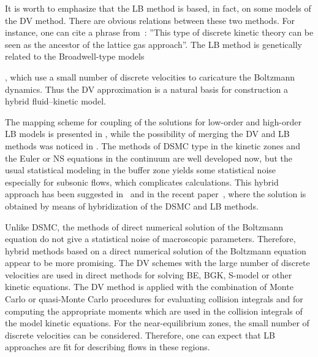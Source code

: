 \documentclass[]{elsarticle} %
\begin{document}
It is worth to emphasize that the LB method is based, in fact, on some models of the DV method.
There are obvious relations between these two methods. For instance, one can cite a phrase from~\cite{Rivet2001}:
''This type of discrete kinetic theory can be seen as the ancestor of the lattice gas approach''.
The LB method is genetically related to the Broadwell-type models~{\cite{Broadwell1964shock, Gatignol1975},
which use a small number of discrete velocities to caricature the Boltzmann dynamics.
Thus the DV approximation is a natural basis for construction a hybrid fluid--kinetic model.

The mapping scheme for coupling of the solutions for low-order and high-order LB models is presented in \cite{Meng2011},
while the possibility of merging the DV and LB methods was noticed in \cite{Succi2016}.
The methods of DSMC type in the kinetic zones and the Euler or NS equations in the continuum are well developed now,
but the usual statistical modeling in the buffer zone yields some statistical noise especially for subsonic flows, which complicates calculations.
This hybrid approach has been suggested in~\cite{Staso2016short, Staso2016long} and in the recent paper~\cite{Staso2018},
where the solution is obtained by means of hybridization of the DSMC and LB methods.

Unlike DSMC, the methods of direct numerical solution of the Boltzmann equation do not give a statistical noise of macroscopic parameters.
Therefore, hybrid methods based on a direct numerical solution of the Boltzmann equation appear to be more promising.
The DV schemes with the large number of discrete velocities are used in direct methods for solving BE, BGK, S-model or other kinetic equations.
The DV method is applied with the combination of Monte Carlo or quasi-Monte Carlo procedures for evaluating collision integrals
and for computing the appropriate moments which are used in the collision integrals of the model kinetic equations.
For the near-equilibrium zones, the small number of discrete velocities can be considered.
Therefore, one can expect that LB approaches are fit for describing flows in these regions.

}
\end{document}
